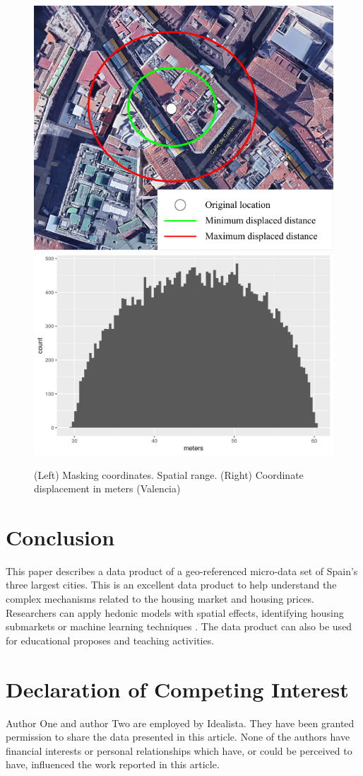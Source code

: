 \documentclass[Royal,times,sageh]{sagej}
\begin{document}
\begin{figure}

{\centering \includegraphics[width=0.29\linewidth,height=0.2\textheight]{EPB_files/points-moved-image} \includegraphics[width=0.37\linewidth,height=0.2\textheight]{EPB_files/coordinates-valencia} 

}

\caption{\label{fig:Anonymizing}(Left) Masking coordinates. Spatial range. (Right) Coordinate displacement in meters (Valencia)}\label{fig:unnamed-chunk-3}
\end{figure}

\hypertarget{conclusion}{%
\section{Conclusion}\label{conclusion}}

This paper describes a data product of a geo-referenced micro-data set
of Spain's three largest cities. This is an excellent data product to
help understand the complex mechanisms related to the housing market and
housing prices. Researchers can apply hedonic models with spatial
effects, identifying housing submarkets or machine learning techniques
\citep[e.g.,][]{rey2023using}. The data product can also be used for
educational proposes and teaching activities.

\hypertarget{declaration-of-competing-interest}{%
\section{Declaration of Competing
Interest}\label{declaration-of-competing-interest}}

Author One and author Two are employed by Idealista. They have been
granted permission to share the data presented in this article. None of
the authors have financial interests or personal relationships which
have, or could be perceived to have, influenced the work reported in
this article.
\end{document}
